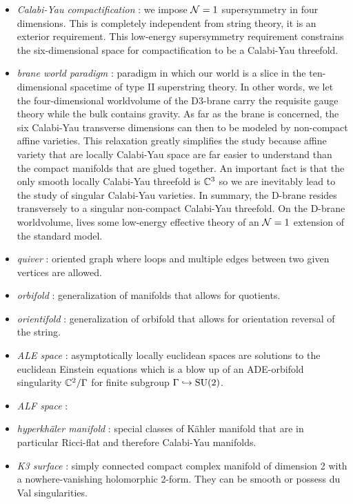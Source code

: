 \documentclass[a4paper,8pt]{article}
\begin{document}
    \begin{itemize}
        \item \emph{Calabi-Yau compactification} : we impose $\mathcal{N}=1$ supersymmetry in four dimensions. This is completely independent from string theory, it is an exterior requirement. This low-energy supersymmetry requirement constrains the six-dimensional space for compactification to be a Calabi-Yau threefold.
        \item \emph{brane world paradigm} : paradigm in which our world is a slice in the ten-dimensional spacetime of type II superstring theory. In other words, we let the four-dimensional worldvolume  of the D3-brane carry the requisite gauge theory while the bulk contains gravity. As far as the brane is concerned, the six Calabi-Yau transverse dimensions can then to be modeled by non-compact affine varieties. This relaxation greatly simplifies the study because affine variety that are locally Calabi-Yau space are far easier to understand than the compact manifolds that are glued together. An important fact is that the only smooth locally Calabi-Yau threefold is $\mathbb{C}^3$ so we are inevitably lead to the study of singular Calabi-Yau varieties. In summary, the D-brane resides transversely to a singular non-compact Calabi-Yau threefold. On the D-brane worldvolume, lives some low-energy effective theory of an $\mathcal{N}=1$ extension of the standard model.
        \item \emph{quiver} : oriented graph where loops and multiple edges between two given vertices are allowed.
        \item \emph{orbifold} : generalization of manifolds that allows for quotients.
        \item \emph{orientifold} : generalization of orbifold that allows for orientation reversal of the string.
        \item \emph{ALE space} : asymptotically locally euclidean spaces are solutions to the euclidean Einstein equations which is a blow up of an ADE-orbifold singularity $\mathbb{C}^2/\Gamma$ for finite subgroup $\Gamma\hookrightarrow\text{SU}(2)$.
        \item \emph{ALF space} :
        \item \emph{hyperkhäler manifold} : special classes of Kähler manifold that are in particular Ricci-flat and therefore Calabi-Yau manifolds.
        \item \emph{K3 surface} : simply connected compact complex manifold of dimension 2 with a nowhere-vanishing holomorphic 2-form. They can be smooth or possess du Val singularities.

\end{itemize}
\end{document}

